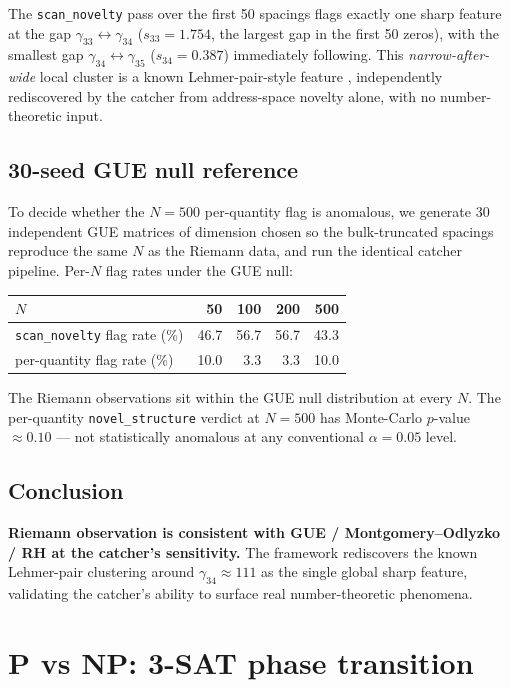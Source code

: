 \documentclass[11pt,letterpaper]{article}
\begin{document}
The \texttt{scan\_novelty} pass over the first 50 spacings flags exactly one sharp feature at the gap $\gamma_{33} \leftrightarrow \gamma_{34}$ ($s_{33} = 1.754$, the largest gap in the first 50 zeros), with the smallest gap $\gamma_{34} \leftrightarrow \gamma_{35}$ ($s_{34} = 0.387$) immediately following. This \emph{narrow-after-wide} local cluster is a known Lehmer-pair-style feature \cite{lehmer1956}, independently rediscovered by the catcher from address-space novelty alone, with no number-theoretic input.

\subsection{30-seed GUE null reference}

To decide whether the $N=500$ per-quantity flag is anomalous, we generate 30 independent GUE matrices of dimension chosen so the bulk-truncated spacings reproduce the same $N$ as the Riemann data, and run the identical catcher pipeline. Per-$N$ flag rates under the GUE null:

\begin{center}
\begin{tabular}{lrrrr}
\toprule
$N$ & 50 & 100 & 200 & 500\\
\midrule
\texttt{scan\_novelty} flag rate (\%) & 46.7 & 56.7 & 56.7 & 43.3\\
per-quantity flag rate (\%) & 10.0 & 3.3 & 3.3 & 10.0\\
\bottomrule
\end{tabular}
\end{center}

The Riemann observations sit within the GUE null distribution at every $N$. The per-quantity \texttt{novel\_structure} verdict at $N=500$ has Monte-Carlo $p$-value $\approx 0.10$ --- not statistically anomalous at any conventional $\alpha = 0.05$ level.

\subsection{Conclusion}

\textbf{Riemann observation is consistent with GUE / Montgomery--Odlyzko / RH at the catcher's sensitivity.} The framework rediscovers the known Lehmer-pair clustering around $\gamma_{34} \approx 111$ as the single global sharp feature, validating the catcher's ability to surface real number-theoretic phenomena.

\section{P vs NP: 3-SAT phase transition}\label{sec:pvsnp}
\end{document}
